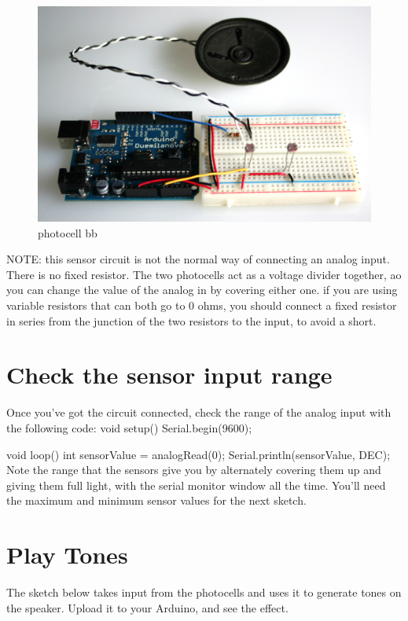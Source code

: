 \begin{figure}[!htb]
 \centering
 \includegraphics[scale=0.1]{img/toneout/photocell_bb.jpg}
 \caption{photocell bb}
 \label{photocell bb}
\end{figure}


NOTE: this sensor circuit is not the normal way of connecting an analog input. There is no fixed resistor. The two photocells act as a voltage divider together, ao you can change the value of the analog in by covering either one. if you are using variable resistors that can both go to 0 ohms, you should connect a fixed resistor in series from the junction of the two resistors to the input, to avoid a short.

\section{Check the sensor input range}

Once you've got the circuit connected, check the range of the analog input with the following code:
 void setup() {
   Serial.begin(9600);
 }

 void loop() {
   int sensorValue = analogRead(0);
   Serial.println(sensorValue, DEC);
 }
Note the range that the sensors give you by alternately covering them up and giving them full light, with the serial monitor window all the time. You'll need the maximum and minimum sensor values for the next sketch.

\section{Play Tones}

The sketch below takes input from the photocells and uses it to generate tones on the speaker. Upload it to your Arduino, and see the effect.

